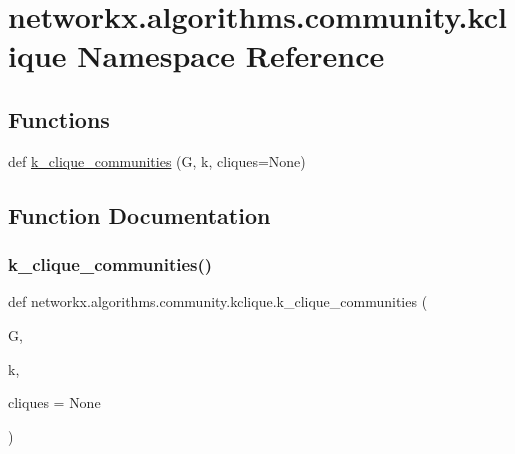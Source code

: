 \hypertarget{namespacenetworkx_1_1algorithms_1_1community_1_1kclique}{}\section{networkx.\+algorithms.\+community.\+kclique Namespace Reference}
\label{namespacenetworkx_1_1algorithms_1_1community_1_1kclique}
\subsection*{Functions}
\begin{DoxyCompactItemize}
\item 
def \hyperlink{namespacenetworkx_1_1algorithms_1_1community_1_1kclique_aef4b33b819cbcc3666168f64bee8434b}{k\+\_\+clique\+\_\+communities} (G, k, cliques=None)
\end{DoxyCompactItemize}


\subsection{Function Documentation}
\mbox{\label{namespacenetworkx_1_1algorithms_1_1community_1_1kclique_aef4b33b819cbcc3666168f64bee8434b}} 
\subsubsection{\texorpdfstring{k\+\_\+clique\+\_\+communities()}{k\_clique\_communities()}}
{\footnotesize\ttfamily def networkx.\+algorithms.\+community.\+kclique.\+k\+\_\+clique\+\_\+communities (\begin{DoxyParamCaption}\item[{}]{G,  }\item[{}]{k,  }\item[{}]{cliques = {\ttfamily None} }\end{DoxyParamCaption})}

